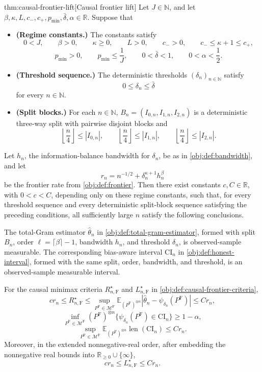 \documentclass[11pt]{article}
\begin{document}
\begin{theoremv}{thm:causal-frontier-lift}[Causal frontier lift]
Let \(J\in\mathbb N\), and let \(\beta,\kappa,L,c_-,c_+,p_{\min},\bar\delta,\alpha\in\mathbb R\). Suppose that
\begin{itemize}
\item \textbf{(Regime constants.)} The constants satisfy
\[
0<J,\qquad
\beta>0,\qquad
\kappa\geq0,\qquad
L>0,\qquad
c_->0,\qquad
c_-\leq \kappa+1\leq c_+,
\]
\[
p_{\min}>0,\qquad
p_{\min}\leq \frac1J,\qquad
0<\bar\delta<1,\qquad
0<\alpha<\frac12 .
\]
\item \textbf{(Threshold sequence.)} The deterministic thresholds \((\delta_n)_{n\in\mathbb N}\) satisfy
\[
0\leq \delta_n\leq \bar\delta
\]
for every \(n\in\mathbb N\).
\item \textbf{(Split blocks.)} For each \(n\in\mathbb N\), \(B_n=(I_{0,n},I_{1,n},I_{2,n})\) is a deterministic three-way split with pairwise disjoint blocks and
\[
\left\lfloor \frac n4\right\rfloor\leq |I_{0,n}|,\qquad
\left\lfloor \frac n4\right\rfloor\leq |I_{1,n}|,\qquad
\left\lfloor \frac n4\right\rfloor\leq |I_{2,n}|.
\]
\end{itemize}
Let \(h_n\), the information-balance bandwidth for \(\delta_n\), be as in \cref{obj:def:bandwidth}, and let
\[
r_n=n^{-1/2}+\delta_n^{\kappa+1}h_n^\beta
\]
be the frontier rate from \cref{obj:def:frontier}. Then there exist constants \(c,C\in\mathbb R\), with \(0<c<C\), depending only on these regime constants, such that, for every threshold sequence and every deterministic split-block sequence satisfying the preceding conditions, all sufficiently large \(n\) satisfy the following conclusions.

The total-Gram estimator \(\widehat\theta_n\) in \cref{obj:def:total-gram-estimator}, formed with split \(B_n\), order \(\ell=\lceil\beta\rceil-1\), bandwidth \(h_n\), and threshold \(\delta_n\), is observed-sample measurable. The corresponding bias-aware interval \(\mathrm{CI}_n\) in \cref{obj:def:honest-interval}, formed with the same split, order, bandwidth, and threshold, is an observed-sample measurable interval.

For the causal minimax criteria \(R_{n,\mathrm F}^\star\) and \(L_{n,\mathrm F}^\star\) in \cref{obj:def:causal-frontier-criteria},
\[
c r_n\leq R_{n,\mathrm F}^\star
\leq
\sup_{P^{\mathrm F}\in\mathcal M^{\mathrm F}}
\mathbb E_{(P^{\mathrm F})^{\otimes n}}
\left|\widehat\theta_n-\psi_{\delta_n}(P^{\mathrm F})\right|
\leq C r_n,
\]
\[
\inf_{P^{\mathrm F}\in\mathcal M^{\mathrm F}}
(P^{\mathrm F})^{\otimes n}\{\psi_{\delta_n}(P^{\mathrm F})\in \mathrm{CI}_n\}
\geq 1-\alpha,
\]
\[
\sup_{P^{\mathrm F}\in\mathcal M^{\mathrm F}}
\mathbb E_{(P^{\mathrm F})^{\otimes n}}\operatorname{len}(\mathrm{CI}_n)
\leq C r_n.
\]
Moreover, in the extended nonnegative-real order, after embedding the nonnegative real bounds into \(\mathbb R_{\geq0}\cup\{\infty\}\),
\[
c r_n\leq L_{n,\mathrm F}^\star\leq C r_n .
\]
\end{theoremv}
\end{document}
